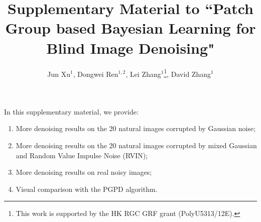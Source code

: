 \documentclass[runningheads]{llncs}
\begin{document}
\pagestyle{headings}
\mainmatter
\def\ECCV16SubNumber{***}  %

\title{Supplementary Material to ``Patch Group based Bayesian Learning for Blind Image Denoising"} %

\author{Jun Xu$^{1}$, Dongwei Ren$^{1,2}$, Lei Zhang$^{1}$\footnote{This work is supported by the HK RGC GRF grant (PolyU5313/12E).}, David Zhang$^{1}$} %


\maketitle

In this supplementary material, we provide:
\begin{enumerate}
\item More denoising results on the 20 natural images corrupted by Gaussian noise;
\item More denoising results on the 20 natural images corrupted by mixed Gaussian and Random Value Impulse Noise (RVIN);
\item More denoising results on real noisy images;
\item Visual comparison with the PGPD algorithm.
\end{enumerate}
\end{document}
